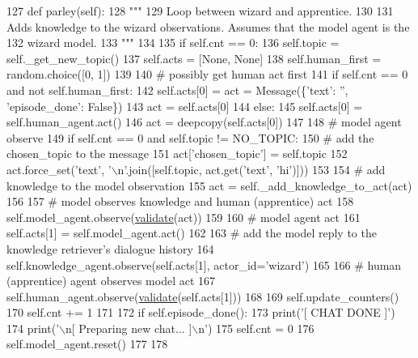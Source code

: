 \begin{DoxyCode}
127     \textcolor{keyword}{def }parley(self):
128         \textcolor{stringliteral}{"""}
129 \textcolor{stringliteral}{        Loop between wizard and apprentice.}
130 \textcolor{stringliteral}{}
131 \textcolor{stringliteral}{        Adds knowledge to the wizard observations. Assumes that the model agent is the}
132 \textcolor{stringliteral}{        wizard model.}
133 \textcolor{stringliteral}{        """}
134 
135         \textcolor{keywordflow}{if} self.cnt == 0:
136             self.topic = self.\_get\_new\_topic()
137             self.acts = [\textcolor{keywordtype}{None}, \textcolor{keywordtype}{None}]
138             self.human\_first = random.choice([0, 1])
139 
140         \textcolor{comment}{# possibly get human act first}
141         \textcolor{keywordflow}{if} self.cnt == 0 \textcolor{keywordflow}{and} \textcolor{keywordflow}{not} self.human\_first:
142             self.acts[0] = act = Message(\{\textcolor{stringliteral}{'text'}: \textcolor{stringliteral}{''}, \textcolor{stringliteral}{'episode\_done'}: \textcolor{keyword}{False}\})
143             act = self.acts[0]
144         \textcolor{keywordflow}{else}:
145             self.acts[0] = self.human\_agent.act()
146             act = deepcopy(self.acts[0])
147 
148         \textcolor{comment}{# model agent observe}
149         \textcolor{keywordflow}{if} self.cnt == 0 \textcolor{keywordflow}{and} self.topic != NO\_TOPIC:
150             \textcolor{comment}{# add the chosen\_topic to the message}
151             act[\textcolor{stringliteral}{'chosen\_topic'}] = self.topic
152             act.force\_set(\textcolor{stringliteral}{'text'}, \textcolor{stringliteral}{'\(\backslash\)n'}.join([self.topic, act.get(\textcolor{stringliteral}{'text'}, \textcolor{stringliteral}{'hi'})]))
153 
154         \textcolor{comment}{# add knowledge to the model observation}
155         act = self.\_add\_knowledge\_to\_act(act)
156 
157         \textcolor{comment}{# model observes knowledge and human (apprentice) act}
158         self.model\_agent.observe(\hyperlink{namespaceparlai_1_1core_1_1worlds_afc3fad603b7bce41dbdc9cdc04a9c794}{validate}(act))
159 
160         \textcolor{comment}{# model agent act}
161         self.acts[1] = self.model\_agent.act()
162 
163         \textcolor{comment}{# add the model reply to the knowledge retriever's dialogue history}
164         self.knowledge\_agent.observe(self.acts[1], actor\_id=\textcolor{stringliteral}{'wizard'})
165 
166         \textcolor{comment}{# human (apprentice) agent observes model act}
167         self.human\_agent.observe(\hyperlink{namespaceparlai_1_1core_1_1worlds_afc3fad603b7bce41dbdc9cdc04a9c794}{validate}(self.acts[1]))
168 
169         self.update\_counters()
170         self.cnt += 1
171 
172         \textcolor{keywordflow}{if} self.episode\_done():
173             print(\textcolor{stringliteral}{'[ CHAT DONE ]'})
174             print(\textcolor{stringliteral}{'\(\backslash\)n[ Preparing new chat... ]\(\backslash\)n'})
175             self.cnt = 0
176             self.model\_agent.reset()
177 
178 
\end{DoxyCode}


